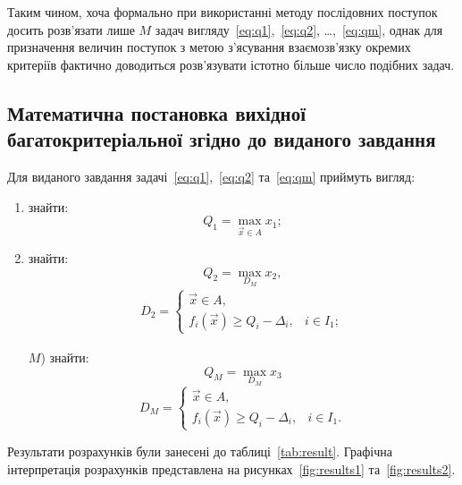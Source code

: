 Таким чином, хоча формально при використанні методу послідовних поступок досить розв'язати лише $M$ задач вигляду~\eqref{eq:q1},~\eqref{eq:q2}, \dots ,~\eqref{eq:qm}, однак для призначення величин поступок з метою з'ясування взаємозв'язку окремих критеріїв фактично доводиться розв'язувати істотно більше число подібних задач.

\subsection{Математична постановка вихідної багатокритеріальної згідно до виданого завдання}
Для виданого завдання задачі~\eqref{eq:q1},~\eqref{eq:q2} та~\eqref{eq:qm} приймуть вигляд:
\begin{enumerate}[label=\arabic*)]
	\item знайти: 
	\[
		Q_1 = \max_{\vec{x} \in A} x_1;
	\]
	\item знайти:
	\[
		Q_2 = \max_{D_M} x_2,
	\]
	\begin{gather*}
		D_2= \begin{cases} 
			\vec{x} \in A, \\
			f_i(\vec{x}) \geq Q_i - \Delta_i, & i \in I_1;  
		\end{cases}
	\end{gather*}
	\dotfill
	\item[$M$)] знайти: 
	\[
		Q_M = \max_{D_M} x_3
	\]
	\[
		D_M = \begin{cases}
			\vec{x} \in A, \\
			f_i(\vec{x}) \geq Q_i - \Delta_i, & i \in I_1.
		\end{cases}
	\]
\end{enumerate}

Результати розрахунків були занесені до таблиці~\ref{tab:result}.
Графічна інтерпретація розрахунків представлена на рисунках~\ref{fig:results1} та~\ref{fig:results2}.

